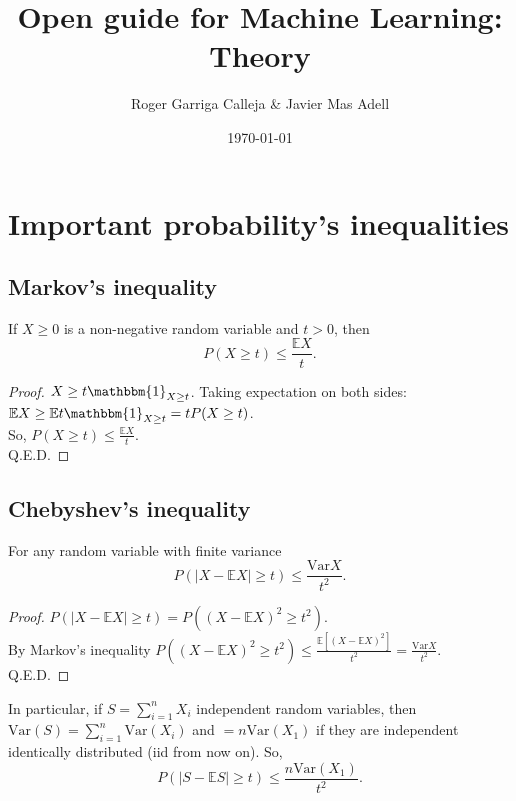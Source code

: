\documentclass[11pt, english]{article}
\title{Open guide for Machine Learning: Theory}
\author{Roger Garriga Calleja \& Javier Mas Adell}
\date{\today}
\newcommand{\su}[2]{\sum\limits_{#1}^{#2}}
\begin{document}
\maketitle

\section{Important probability's inequalities}

\subsection*{Markov's inequality}

If $X\geq 0$ is a non-negative random variable and $t>0$, then
\begin{equation}
	P(X\geq t)\leq \frac{\mathbb{E}X}{t}.
\end{equation}
\begin{proof}
	$X\geq t\mathbbm{1}_{X\geq t}$. Taking expectation on both sides: $\mathbb{E}X\geq \mathbb{E}t\mathbbm{1}_{X\geq t}=tP(X\geq t)$. \\ So, $P(X\geq t) \leq \frac{\mathbb{E}X}{t}$. \\ Q.E.D.
\end{proof}

\subsection*{Chebyshev's inequality}

For any random variable with finite variance
\begin{equation}
	P(|X-\mathbb{E}X|\geq t)\leq \frac{\text{Var} X}{t^2}.
\end{equation}

\begin{proof}
	$P(|X-\mathbb{E}X|\geq t)=P((X-\mathbb{E}X)^2\geq t^2)$. \\
	By Markov's inequality $P((X-\mathbb{E}X)^2\geq t^2)\leq \frac{\mathbb{E}[(X-\mathbb{E}X)^2]}{t^2}=\frac{\text{Var} X}{t^2}$.\\
	Q.E.D.
\end{proof}

In particular, if $S=\su{i=1}{n} X_i$ independent random variables, then $\text{Var}(S)=\sum\limits_{i=1}^n \text{Var}(X_i)$ and $=n\text{Var}(X_1)$ if they are independent identically distributed (iid from now on). So,
\begin{equation}
	P(|S-\mathbb{E} S|\geq t)\leq \frac{n\text{Var}(X_1)}{t^2}.
\end{equation}
\end{document}

